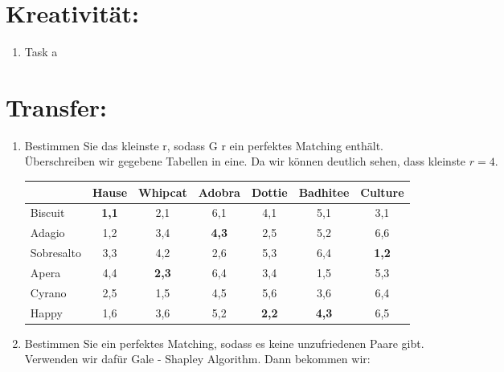     \section*{Kreativität:}
    \begin{enumerate}[label=(\alph*)]
    	\item Task a
    \end{enumerate}
    \section*{Transfer:}
    \begin{enumerate}[label=(\alph*)]
    	\item Bestimmen Sie das kleinste r, sodass G r ein perfektes Matching enthält.\\
        Überschreiben wir gegebene Tabellen in eine. Da wir können deutlich sehen, dass kleinste $r=4$.
        \begin{table}
            \begin{tabular}{|l|c|c|c|c|c|c|}
            \hline
            ~          & Hause     & Whipcat   & Adobra    & Dottie    & Badhitee  & Culture   \\ \hline
            Biscuit    & {\bf 1,1} & 2,1       & 6,1       & 4,1       & 5,1       & 3,1       \\ \hline
            Adagio     & 1,2       & 3,4       & {\bf 4,3} & 2,5       & 5,2       & 6,6       \\ \hline
            Sobresalto & 3,3       & 4,2       & 2,6       & 5,3       & 6,4       & {\bf 1,2} \\ \hline
            Apera      & 4,4       & {\bf 2,3} & 6,4       & 3,4       & 1,5       & 5,3       \\ \hline
            Cyrano     & 2,5       & 1,5       & 4,5       & 5,6       & 3,6       & 6,4       \\ \hline
            Happy      & 1,6       & 3,6       & 5,2       & {\bf 2,2} & {\bf 4,3} & 6,5       \\ \hline
            \end{tabular}
        \end{table}
        \item Bestimmen Sie ein perfektes Matching, sodass es keine unzufriedenen Paare gibt.\\
        Verwenden wir dafür Gale - Shapley Algorithm. Dann bekommen wir:
        \begin{table}
            \begin{tabular}{|l|c|c|c|c|c|c|}

\end{tabular}
\end{table}
\end{enumerate}
